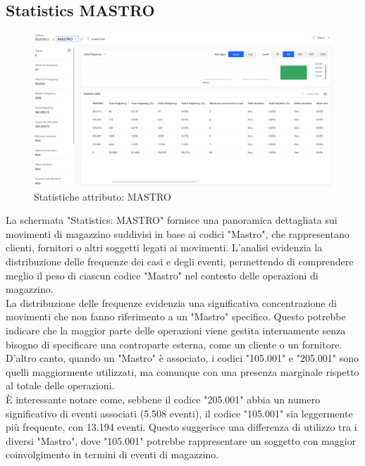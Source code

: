 \documentclass{article}
\begin{document}
\subsection{Statistics MASTRO}
\begin{figure}[H]
    \centering
    \includegraphics[width=\textwidth]{imgMicrosoft/DatiReali/StatisticsMASTRODatiReali.png}
    \caption{Statistiche attributo: MASTRO}
    \label{fig:statistics-MASTRO}
\end{figure}
La schermata "Statistics: MASTRO" fornisce una panoramica dettagliata sui movimenti di magazzino suddivisi in base ai codici "Mastro", che rappresentano clienti, fornitori o altri soggetti legati ai movimenti. L'analisi evidenzia la distribuzione delle frequenze dei casi e degli eventi, permettendo di comprendere meglio il peso di ciascun codice "Mastro" nel contesto delle operazioni di magazzino.\\
La distribuzione delle frequenze evidenzia una significativa concentrazione di movimenti che non fanno riferimento a un "Mastro" specifico. Questo potrebbe indicare che la maggior parte delle operazioni viene gestita internamente senza bisogno di specificare una controparte esterna, come un cliente o un fornitore. D'altro canto, quando un "Mastro" è associato, i codici "105.001" e "205.001" sono quelli maggiormente utilizzati, ma comunque con una presenza marginale rispetto al totale delle operazioni.\\
È interessante notare come, sebbene il codice "205.001" abbia un numero significativo di eventi associati (5.508 eventi), il codice "105.001" sia leggermente più frequente, con 13.194 eventi. Questo suggerisce una differenza di utilizzo tra i diversi "Mastro", dove "105.001" potrebbe rappresentare un soggetto con maggior coinvolgimento in termini di eventi di magazzino.
\end{document}

